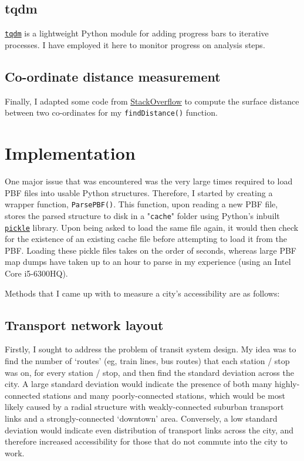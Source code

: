 \documentclass[12pt]{article} %
\begin{document}
\subsection{tqdm}
\href{https://tqdm.github.io/}{\texttt{tqdm}} is a lightweight Python module for adding progress bars to iterative processes. I have employed it here to monitor progress on analysis steps.

\subsection{Co-ordinate distance measurement}
Finally, I adapted some code from \href{https://stackoverflow.com/a/19412565}{StackOverflow} to compute the surface distance between two co-ordinates for my \texttt{findDistance()} function.


\section{Implementation}
One major issue that was encountered was the very large times required to load PBF files into usable Python structures. Therefore, I started by creating a wrapper function, \texttt{ParsePBF()}. This function, upon reading a new PBF file, stores the parsed structure to disk in a "\texttt{cache}" folder using Python's inbuilt \href{https://docs.python.org/3/library/pickle.html}{\texttt{pickle}} library. Upon being asked to load the same file again, it would then check for the existence of an existing cache file before attempting to load it from the PBF. Loading these pickle files takes on the order of seconds, whereas large PBF map dumps have taken up to an hour to parse in my experience (using an Intel Core i5-6300HQ).

Methods that I came up with to measure a city's accessibility are as follows:

\subsection{Transport network layout}
Firstly, I sought to address the problem of transit system design. My idea was to find the number of `routes' (eg, train lines, bus routes) that each station / stop was on, for every station / stop, and then find the standard deviation across the city. A large standard deviation would indicate the presence of both many highly-connected stations and many poorly-connected stations, which would be most likely caused by a radial structure with weakly-connected suburban transport links and a strongly-connected `downtown' area. Conversely, a low standard deviation would indicate even distribution of transport links across the city, and therefore increased accessibility for those that do not commute into the city to work.
\end{document}
